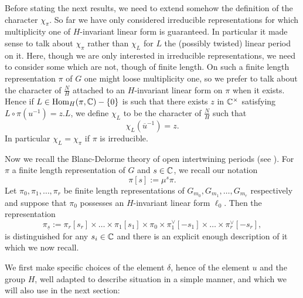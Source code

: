 \documentclass[11pt,letterpaper]{amsart}
\newcommand{\Hom}{\mathrm{Hom}}
\theoremstyle{plain}
\numberwithin{equation}{section}
\begin{document}
Before stating the next results, we need to extend somehow the definition of the character $\chi_{\pi}$. So far we have only considered irreducible representations for which multiplicity one of $H$-invariant linear form is guaranteed. In particular it made sense to talk about $\chi_{\pi}$ rather than $\chi_{L}$ for $L$ the (possibly twisted) linear period on it. Here, though we are only interested in irreducible representations, we need to consider some which are not, though of finite length. On such a finite length representation $\pi$ of $G$ one might loose multiplicity one, so we prefer to talk about the character of $\frac{N}{H}$ attached to an $H$-invariant linear form on $\pi$ when it exists. Hence if $L\in \Hom_H(\pi,\BC)-\{0\}$ is such that there exists $z$ in ${\mathbb {C}}^\times$ satisfying $L\circ \pi(u^{-1})=z.L$, we define $\chi_L$ to be the character of $\frac{N}{H}$ such that 
\[\chi_L(\overline{u}^{-1})=z.\] In particular $\chi_L=\chi_{\pi}$ if $\pi$ is irreducible. 

Now we recall the Blanc-Delorme theory of 
open intertwining periods (see \cite{BD}). For $\pi$ a finite length representation of $G$ and $s\in {\mathbb {C}}$, we recall our notation \[\pi[s]:=\mu^s\pi.\] Let $\pi_0,\pi_1,\dots,\pi_r$ be finite length representations of $G_{m_0},G_{m_1},\dots,G_{m_r}$ respectively and suppose that $\pi_0$ possesses an $H$-invariant linear form $\ell_0$. Then the representation 
\[\pi_{\underline{s}}:=\pi_r[s_r]\times \dots \times \pi_1[s_1]\times \pi_0\times  \pi_1^\vee [-s_1]\times \dots \times  \pi_r^\vee [-s_r],\] is distinguished for any $s_i\in {\mathbb {C}}$ and there is an explicit enough description of it which we now recall. 

We first make specific choices of the element $\delta$, hence of the element $u$ and the group $H$, well adapted to describe  situation in a simple manner, and which we will also use in the next section:
\end{document}
